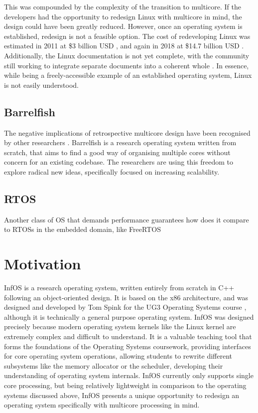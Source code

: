 \documentclass[bsc,frontabs,twoside,singlespacing,parskip,deptreport]{infthesis}     %
\begin{document}
This was compounded by the complexity of the transition to multicore. If the developers had the opportunity to redesign Linux with multicore in mind, the design could have been greatly reduced. However, once an operating system is established, redesign is not a feasible option. The cost of redeveloping Linux was estimated in 2011 at \$3 billion USD \cite{linux-kernel-cost}, and again in 2018 at \$14.7 billion USD \cite{cost-to-redev}. Additionally, the Linux documentation is not yet complete, with the community still working to integrate separate documents into a coherent whole \cite{linux-docs}. In essence, while being a freely-accessible example of an established operating system, Linux is not easily understood.

\subsection{Barrelfish}
The negative implications of retrospective multicore design have been recognised by other researchers \cite{barrelfish-article}. Barrelfish \cite{barrelfish-website} is a research operating system written from scratch, that aims to find a good way of organising multiple cores without concern for an existing codebase. The researchers are using this freedom to explore radical new ideas, specifically focused on increasing scalability.


\subsection{RTOS}
Another class of OS that demands performance guarantees
how does it compare to RTOSs in the embedded domain, like FreeRTOS

\section{Motivation} \label{motivation}
InfOS \cite{infos} is a research operating system, written entirely from scratch in C++ following an object-oriented design. It is based on the x86 architecture, and was designed and developed by Tom Spink for the UG3 Operating Systems course \cite{ug3os}, although it is technically a general purpose operating system. InfOS was designed precisely because modern operating system kernels like the Linux kernel are extremely complex and difficult to understand. It is a valuable teaching tool that forms the foundations of the Operating Systems coursework, providing interfaces for core operating system operations, allowing students to rewrite different subsystems like the memory allocator or the scheduler, developing their understanding of operating system internals. InfOS currently only supports single core processing, but being relatively lightweight in comparison to the operating systems discussed above, InfOS presents a unique opportunity to redesign an operating system specifically with multicore processing in mind. 
\end{document}
